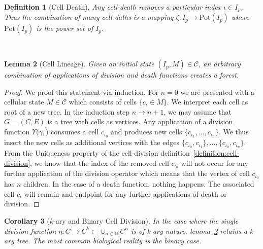 \documentclass{article}
\newcommand{\todo}[1]{\colorbox{WildStrawberry}{\textcolor{white}{#1}}}
\newtheorem{definition}{Definition}[section]
\newtheorem{lemma}[definition]{Lemma}
\newtheorem{corollary}[definition]{Corollary}
\begin{document}
\begin{definition}[Cell Death]
    \label{definition:cell-death}
    Any cell-death removes a particular index $\iota\in I_p$.
    Thus the combination of many cell-daths is a mapping $\zeta:I_p\rightarrow \text{Pot}(I_p)$
    where $\text{Pot}(I_p)$ is the power set of $I_p$.

\todo{
    - apoptosis
    - necrosis
    - removal
}
\end{definition}

\begin{lemma}[Cell Lineage]
    \label{lemma:cell-lineage}
    Given an initial state $(I_p,M)\in\mathscr{C}$, an arbitrary combination of applications of
    division and death functions creates a forest.
\end{lemma}
\begin{proof}
    We proof this statement via induction. For $n=0$ we are presented with a cellular state
    $M\in\mathscr{C}$ which consists of cells $\{c_\iota\in M\}$.
    We interpret each cell as root of a new tree.
    In the induction step $n\rightarrow n+1$, we may assume that $G=(C,E)$ is a tree with
    cells as vertices.
    Any application of a division function $\Upsilon(\gamma, \dot)$ consumes a cell $c_{\iota_0}$
    and produces new cells $\{c_{\iota_1},\dots,c_{\iota_n}\}$.
    We thus insert the new cells as additional vertices with the edges
    $\{c_{\iota_0},c_{\iota_1}\},\dots,\{c_{\iota_0},c_{\iota_n}\}$.
    From the Uniqueness property of the cell-division definition~\ref{definition:cell-division},
    we know that the index of the removed cell $c_{\iota_0}$ will not occur for any further
    application of the division operator which means that the vertex of cell $c_{\iota_0}$ has $n$
    children.
    In the case of a death function, nothing happens.
    The associated cell $c_\iota$ will remain and endpoint for any further applications of death
    or division.
\end{proof}
\begin{corollary}[$k$-ary and Binary Cell Division]
    In the case where the single division function
    $\eta:C\rightarrow C^k\subset\cup_{n\in\mathbb{N}}C^n$
    is of k-ary nature, lemma~\ref{lemma:cell-lineage} retains a k-ary tree.
    The most common biological reality is the binary case.
\end{corollary}

\end{document}
